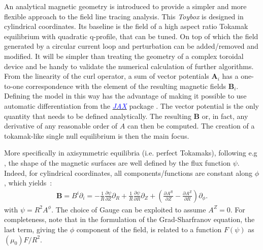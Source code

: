 An analytical magnetic geometry is introduced to provide a simpler and more flexible approach to the field line tracing analysis. This \textit{Toybox} is designed in cylindrical coordinates. Its baseline is the field of a high aspect ratio Tokamak equilibrium with quadratic q-profile, that can be tuned. On top of which the field generated by a circular current loop and perturbation can be added/removed and modified. It will be simpler than treating the geometry of a complex toroidal device and be handy to validate the numerical calculation of further algorithms. From the linearity of the curl operator, a sum of vector potentials $\textbf{A}_i$ has a one-to-one correspondence with the element of the resulting magnetic fields $\textbf{B}_i$. Defining the model in this way has the advantage of making it possible to use automatic differentiation from the 
\href{https://jax.readthedocs.io/en/latest/index.html}{\textcolor{blue}{\textit{JAX}}}
package \cite{bradbury_jax_2018}. The vector potential is the only quantity that needs to be defined analytically. The resulting $\textbf{B}$ or, in fact, any derivative of any reasonable order of $A$ can then be computed. The creation of a tokamak-like single null equilibrium is then the main focus.

More specifically in axisymmetric equilibria (i.e. perfect Tokamaks), following e.g \cite[p.108]{wesson_tokamaks_2011}, the shape of the magnetic surfaces are well defined by the flux function  $\psi$. Indeed, for cylindrical coordinates, all components/functions are constant along $\phi$, which yields~:
\begin{align*}
    \textbf{B} = B^i\partial_i = -\frac{1}{R}\frac{\partial\psi}{\partial Z}\partial_R +\frac{1}{R}\frac{\partial\psi}{\partial R}\partial_Z + \left(\frac{\partial A^R}{\partial Z} - \frac{\partial A^Z}{\partial R}\right)\partial_\phi.
\end{align*}
with $\psi = R^2 A^\phi$. The choice of Gauge can be exploited to assume $A^Z = 0$. For completeness, note that in the formulation of the Grad-Sharfranov equation, the last term, giving the $\phi$ component of the field, is related to a function $F(\psi)$ as $(\mu_0) F/R^2$.

